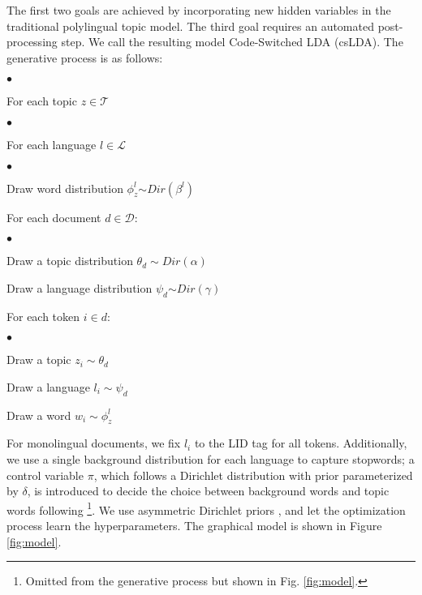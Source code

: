 \documentclass[11pt]{article}
\newcommand{\squishlisttwo}{
 \begin{list}{$\bullet$}
  { \setlength{\itemsep}{0pt}
     \setlength{\parsep}{0pt}
    \setlength{\topsep}{0pt}
    \setlength{\partopsep}{0pt}
    \setlength{\leftmargin}{2em}
    \setlength{\labelwidth}{1.5em}
    \setlength{\labelsep}{0.5em} } }
\newcommand{\squishend}{
  \end{list}  }
\begin{document}
The first two goals are achieved by incorporating new hidden variables in the traditional polylingual topic model. The third goal requires an automated post-processing step.
We call the resulting model Code-Switched LDA (csLDA). The generative process is as follows:


\squishlisttwo
\item For each topic $z \in \mathcal{T}$
	\squishlisttwo
	\item For each language $l \in \mathcal{L}$
		\squishlisttwo
		\item Draw word distribution $\phi_z^{l}$$\sim$$Dir(\beta^l)$
		\squishend
	\squishend
\item For each document $d \in \mathcal{D}$:
	\squishlisttwo
	\item Draw a topic distribution $\theta_d \sim Dir(\alpha)$
	\item Draw a language distribution $\psi_d$$\sim$$Dir(\gamma)$
	\item For each token $i \in d$:
		\squishlisttwo
		\item Draw a topic $z_i \sim \theta_d$
		\item Draw a language $l_i \sim \psi_d$
		\item Draw a word $w_i \sim \phi_z^l$
		\squishend
	\squishend
\squishend
For monolingual documents, we fix $l_i$ to the LID tag for all tokens. Additionally, we use a single background
distribution for each language to capture stopwords; a control variable $\pi$, which follows a Dirichlet distribution with prior 
parameterized by $\delta$, is introduced to decide the choice between background words and topic words following \cite{chemudugunta2006modeling}\footnote{Omitted from the generative process but shown in Fig. \ref{fig:model}.}. 
We use asymmetric Dirichlet priors \cite{wallach2009rethinking}, and let the optimization process learn the 
hyperparameters. The graphical model is shown in Figure \ref{fig:model}.
\end{document}
